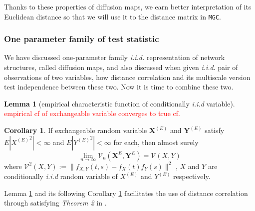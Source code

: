 \documentclass[12pt]{article}
\theoremstyle{definition}
\newtheorem{corollary}{Corollary}[theorem]
\newtheorem{lemma}[theorem]{Lemma}
\begin{document}
Thanks to these properties of diffusion maps, we earn better interpretation of its Euclidean distance so that we will use it to the distance matrix in \texttt{MGC}.
	
\subsubsection{One parameter family of test statistic}

We have discussed one-parameter family \textit{i.i.d.} representation of network structures, called diffusion maps, and also discussed when given \textit{i.i.d}. pair of observations of two variables, how distance correlation and its multiscale version test independence between these two. Now it is time to combine these two.

\begin{lemma}[empirical characteristic function of conditionally \textit{i.i.d} variable]
	\label{main_lemma}
	\textcolor{red}{empirical cf of exchangeable variable converges to true cf.}
\end{lemma}	

\begin{corollary}
 \label{main.cor}
 If exchangeable random variable $\mathbf{X}^{(E)}$ and $\mathbf{Y}^{(E)}$ satisfy $E|{X^{(E)}}^2| < \infty$ and $E|{Y^{(E)}}^2| < \infty$ for each, then almost surely 
 \begin{equation}
 \lim\limits_{n \rightarrow \infty} \mathcal{V}_{n} (\mathbf{X}^{E} , \mathbf{Y}^{E} ) = \mathcal{V}(X, Y)
 \end{equation}
where $\mathcal{V}^2 (X, Y) := \| f_{X,Y}(t,s) - f_{X}(t) f_{Y}(s) \|^2$ , $X$ and $Y$ are conditionally \textit{i.i.d} random variable of $X^{(E)}$ and $Y^{(E)}$ respectively. 
\end{corollary}

Lemma \ref{main_lemma} and its following Corollary \ref{main.cor} facilitates the use of distance correlation through satisfying \textit{Theorem 2} in \cite{szekely2007measuring}.  
	
\end{document}
